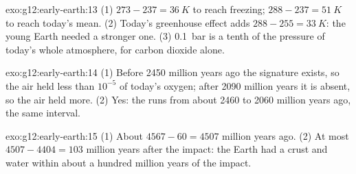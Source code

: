 \begin{solution}{exo:g12:early-earth:13}
(1) $273 - 237 = \qty{36}{K}$ to reach freezing; $288 - 237 = \qty{51}{K}$ to
reach today's mean. (2) Today's greenhouse effect adds $288 - 255 =
\qty{33}{K}$: the young Earth needed a stronger one. (3) \qty{0.1}{bar} is a
tenth of the pressure of today's whole atmosphere, for carbon dioxide alone.
\end{solution}

\begin{solution}{exo:g12:early-earth:14}
(1) Before 2450 million years ago the signature exists, so the air held less
than $10^{-5}$ of today's oxygen; after 2090 million years it is absent, so
the air held more. (2) Yes: the  runs from about 2460 to
2060 million years ago, the same interval.
\end{solution}

\begin{solution}{exo:g12:early-earth:15}
(1) About $4567 - 60 = 4507$ million years ago. (2) At most $4507 - 4404 =
103$ million years after the impact: the Earth had a crust and water within
about a hundred million years of the impact.
\end{solution}

